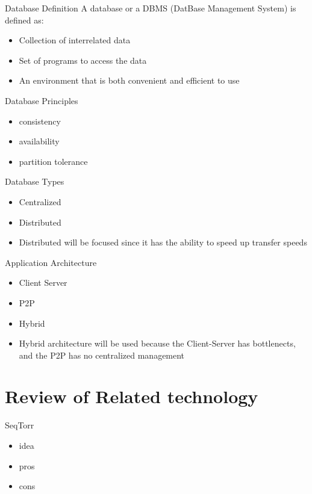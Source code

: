 \documentclass{beamer}
\begin{document}
\begin{frame}{Database Definition}
A database or a DBMS (DatBase Management System) \cite{Silberschatz2010} is defined as:
\begin{itemize}
    \item Collection of interrelated data
    \item Set of programs to access the data
    \item An environment that is both convenient and efficient to use
\end{itemize}
\end{frame}

\begin{frame}{Database Principles}
  \begin{itemize}   
    \item consistency
    \item availability
    \item partition tolerance
  \end{itemize}
\end{frame}

\begin{frame}{Database Types}
  \begin{itemize}   
    \item Centralized
    \item Distributed
    \item Distributed will be focused since it has the ability to speed up transfer speeds
  \end{itemize}
\end{frame}

\begin{frame}{Application Architecture}
  \begin{itemize}   
    \item Client Server
    \item P2P
    \item Hybrid
    \item Hybrid architecture will be used because the Client-Server has bottlenects, and the P2P has no centralized management
  \end{itemize}
\end{frame}

\section{Review of Related technology}

\begin{frame}{SeqTorr}
  \begin{itemize}   
    \item idea
    \item pros
    \item cons
  \end{itemize}
\end{frame}
\end{document}
